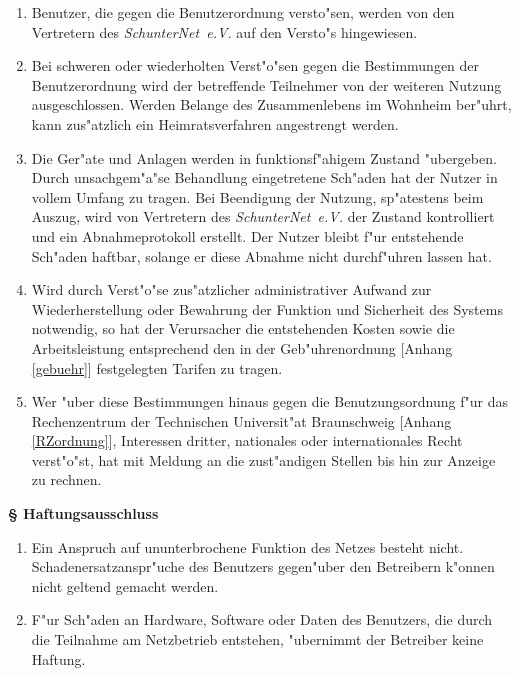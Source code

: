 \documentclass[12pt,titlepage,twoside]{scrartcl}
\newcounter{para_nr}
\newcommand{\Paragraph}[1]{{\large\bf\S{}\sf\textbf{\/\stepcounter{para_nr}\arabic{para_nr} #1}}}
\newcommand{\snev}{\emph{SchunterNet~e.V.} }
\begin{document}
\begin{appendix}
\begin{enumerate}
  \item Benutzer, die gegen die Benutzerordnung versto"sen, werden von den
      Vertretern des \snev auf den Versto"s hingewiesen.
  \item Bei schweren oder wiederholten Verst"o"sen gegen die Bestimmungen der
      Benutzerordnung wird der betreffende Teilnehmer von der weiteren Nutzung
      ausgeschlossen. Werden Belange des Zusammenlebens im Wohnheim ber"uhrt,
      kann zus"atzlich ein Heimratsverfahren angestrengt werden.
  \item Die Ger"ate und Anlagen werden in funktionsf"ahigem Zustand
      "ubergeben. Durch unsachgem"a"se Behandlung eingetretene Sch"aden hat
      der Nutzer in vollem Umfang zu tragen. Bei Beendigung der Nutzung,
      sp"atestens beim Auszug, wird von Vertretern des \snev der Zustand
      kontrolliert und ein Abnahmeprotokoll erstellt. Der Nutzer bleibt f"ur
      entstehende Sch"aden haftbar, solange er diese Abnahme nicht durchf"uhren
      lassen hat.
  \item Wird durch Verst"o"se zus"atzlicher administrativer Aufwand zur
      Wiederherstellung oder Bewahrung der Funktion und Sicherheit des Systems
      notwendig, so hat der Verursacher die entstehenden Kosten sowie die
      Arbeitsleistung entsprechend den in der Geb"uhrenordnung [Anhang
      \ref{gebuehr}] festgelegten Tarifen zu tragen.
  \item Wer "uber diese Bestimmungen hinaus gegen die Benutzungsordnung f"ur
      das Rechenzentrum der Technischen Universit"at Braunschweig [Anhang
      \ref{RZordnung}], Interessen dritter, nationales oder internationales
      Recht verst"o"st, hat mit Meldung an die zust"andigen Stellen bis hin zur
      Anzeige zu rechnen.
\end{enumerate}

\Paragraph{Haftungsausschluss}
\begin{enumerate}
  \item Ein Anspruch auf ununterbrochene Funktion des Netzes besteht
      nicht. Schadenersatzanspr"uche des Benutzers gegen"uber den Betreibern
      k"onnen nicht geltend gemacht werden.
  \item F"ur Sch"aden an Hardware, Software oder Daten des Benutzers, die
      durch die Teilnahme am Netzbetrieb entstehen, "ubernimmt der Betreiber
      keine Haftung.

\end{enumerate}


\end{appendix}
\end{document}
